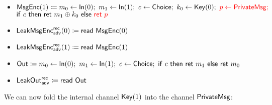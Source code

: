 \begin{itemize}
\item $\mathsf{MsgEnc}(1) \coloneqq m_0 \leftarrow \mathsf{In}(0); \ m_1 \leftarrow \mathsf{In}(1); \ c \leftarrow \mathsf{Choice}; \ k_0 \leftarrow \mathsf{Key}(0); \ {\color{red} p \leftarrow \mathsf{PrivateMsg};}$ \\ $\mathsf{if} \ c \ \mathsf{then} \ \mathsf{ret} \ m_1 \oplus k_0 \ \mathsf{else} \ {\color{red} \mathsf{ret} \ p}$
\item {\color{blue} $\mathsf{LeakMsgEnc}^{\mathsf{rec}}_{\mathsf{adv}}(0) \coloneqq \mathsf{read} \ \mathsf{MsgEnc}(0)$}
\item {\color{blue} $\mathsf{LeakMsgEnc}^{\mathsf{rec}}_{\mathsf{adv}}(1) \coloneqq \mathsf{read} \ \mathsf{MsgEnc}(1)$}
\item $\Out \coloneqq m_0 \leftarrow \In(0); \ m_1 \leftarrow \In(1); \ c \leftarrow \Choice; \ \ifte{c}{\ret{m_1}}{\ret{m_0}}$
\item {\color{blue} $\mathsf{LeakOut}^{\mathsf{rec}}_{\mathsf{adv}} \coloneqq \mathsf{read} \ \mathsf{Out}$}
\end{itemize}

\noindent We can now fold the internal channel $\mathsf{Key}(1)$ into the channel $\mathsf{PrivateMsg}$:

